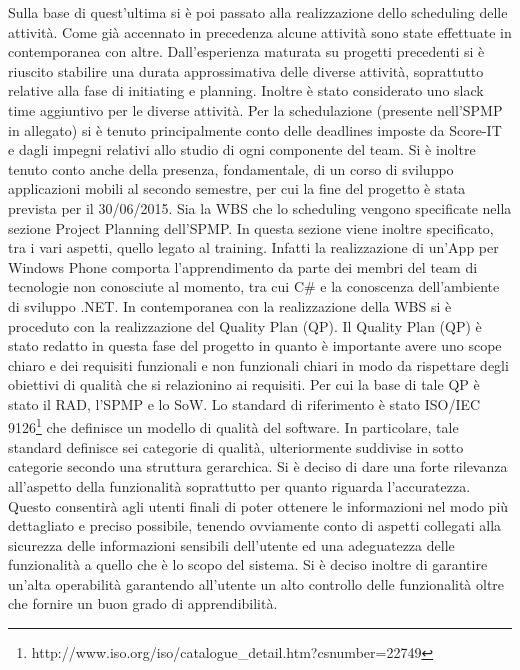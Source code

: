 Sulla base di quest\rq ultima si \`{e} poi passato alla realizzazione dello scheduling delle attivit\`{a}.
Come gi\`{a} accennato in precedenza alcune attivit\`{a} sono state effettuate in contemporanea con altre. Dall\rq esperienza maturata su progetti precedenti si \`{e} riuscito stabilire una durata approssimativa delle diverse attivit\`{a}, soprattutto relative alla fase di initiating e planning.
Inoltre \`{e} stato considerato uno slack time aggiuntivo per le diverse attivit\`{a}.
Per la schedulazione (presente nell\rq SPMP in allegato) si \`{e} tenuto principalmente conto delle deadlines imposte da Score-IT e dagli impegni relativi allo studio di ogni componente del team.
Si \`{e} inoltre tenuto conto anche della presenza, fondamentale, di un corso di sviluppo applicazioni mobili al secondo semestre, per cui la fine del progetto \`{e} stata prevista per il 30/06/2015.
Sia la WBS che lo scheduling vengono specificate nella sezione Project Planning dell\rq SPMP. In questa sezione viene inoltre specificato, tra i vari aspetti, quello legato al training.
Infatti la realizzazione di un\rq App per Windows Phone comporta l\rq apprendimento da parte dei membri del team di tecnologie non conosciute al momento, tra cui C\# e la conoscenza dell\rq ambiente di sviluppo .NET. In contemporanea con la realizzazione della WBS si \`{e} proceduto con la realizzazione del Quality Plan (QP). Il Quality Plan (QP) \`{e} stato redatto in questa fase del progetto in quanto \`{e} importante avere uno scope chiaro e dei requisiti funzionali e non funzionali chiari in modo da rispettare degli obiettivi di qualit\`{a} che si relazionino ai requisiti. Per cui la base di tale QP \`{e} stato il RAD, l\rq SPMP e lo SoW.
Lo standard di riferimento \`{e} stato ISO/IEC 9126\footnote{http://www.iso.org/iso/catalogue_detail.htm?csnumber=22749} che definisce un modello di qualit\`{a} del software. In particolare, tale standard definisce sei categorie di qualit\`{a}, ulteriormente suddivise in sotto categorie secondo una struttura gerarchica. Si \`{e} deciso di dare una forte rilevanza all\rq aspetto della funzionalit\`{a} soprattutto per quanto riguarda l\rq accuratezza.
Questo consentir\`{a} agli utenti finali di poter ottenere le informazioni nel modo pi\`{u} dettagliato e preciso possibile, tenendo ovviamente conto di aspetti collegati alla sicurezza delle informazioni sensibili dell\rq utente ed una adeguatezza delle funzionalit\`{a} a quello che \`{e} lo scopo del sistema.
Si \`{e} deciso inoltre di garantire un\rq alta operabilit\`{a} garantendo all\rq utente un alto controllo delle funzionalit\`{a} oltre che fornire un buon grado di apprendibilit\`{a}.
